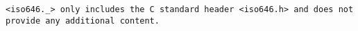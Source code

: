 \tt{<iso646._>} only includes the C standard header
\tt{<iso646.h>} and does not provide any additional content.
